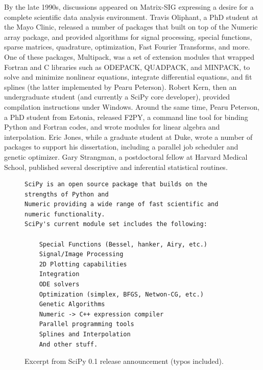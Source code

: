 \documentclass[fleqn,10pt]{wlscirep}
\begin{document}
By the late 1990s, discussions appeared on Matrix-SIG
expressing a desire for a complete scientific data analysis environment\cite{Travis-Keynote-2010}.
Travis Oliphant, a PhD student at the Mayo Clinic,
released a number of packages\cite{Travis-some-modules,Travis-enhance} 
that built on top of the Numeric array
package, and provided algorithms for signal processing, special
functions, sparse matrices, quadrature, optimization, Fast Fourier
Transforms, and more.  One of these packages, Multipack\cite{multipack}, was a set of
extension modules that wrapped Fortran and C libraries such as
ODEPACK\cite{citeulike:2644528}, QUADPACK\cite{1983qspa.book.....P}, and MINPACK\cite{osti_6997568}, to solve and minimize nonlinear
equations, integrate differential equations, and fit splines (the
latter implemented by Pearu Peterson).  Robert Kern, then an
undergraduate student (and currently a SciPy core developer), provided
compilation instructions under Windows.
Around the same time, Pearu Peterson, a PhD student from Estonia,
released F2PY\cite{peterson2009f2py}, a command line tool for binding Python and Fortran
codes, and wrote modules for linear algebra and interpolation.
Eric Jones, while a graduate student at Duke, wrote a number of
packages to support his dissertation, including a parallel job
scheduler and genetic optimizer.
%
%
Gary Strangman, a postdoctoral fellow at Harvard Medical School,
published several descriptive and inferential statistical 
routines\cite{Strangman-modules}.

\begin{figure}
\begin{verbatim}
SciPy is an open source package that builds on the strengths of Python and
Numeric providing a wide range of fast scientific and numeric functionality.
SciPy's current module set includes the following:

    Special Functions (Bessel, hanker, Airy, etc.)
    Signal/Image Processing
    2D Plotting capabilities
    Integration
    ODE solvers
    Optimization (simplex, BFGS, Netwon-CG, etc.)
    Genetic Algorithms
    Numeric -> C++ expression compiler
    Parallel programming tools
    Splines and Interpolation
    And other stuff.
\end{verbatim}
\caption{Excerpt from SciPy 0.1 release announcement (typos included).}\label{fig:announce-0.1}
\end{figure}
\end{document}
